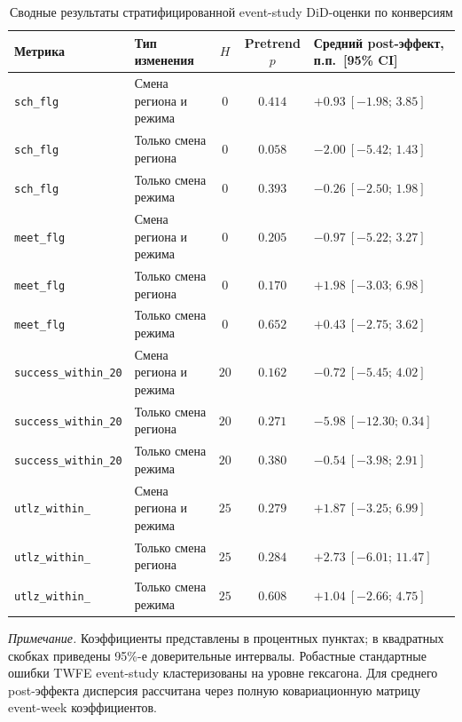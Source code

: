 \documentclass[14pt,a4paper]{extarticle}
\begin{document}
\begin{table}[H]
\centering
\caption{Сводные результаты стратифицированной event-study DiD-оценки по конверсиям}
\label{tab:stratified_did_effects}
\footnotesize
\setlength{\tabcolsep}{3pt}
\renewcommand{\arraystretch}{1.2}
\begin{tabularx}{\textwidth}{@{}l l c c >{\centering\arraybackslash}X@{}}
\toprule
Метрика & Тип изменения & \(H\) & Pretrend \(p\) & Средний post-эффект, п.п.\ [95\% CI] \\
\midrule
\texttt{sch\_flg} & Смена региона и режима & \(0\) & \(0.414\) & \(+0.93\ [-1.98;\,3.85]\) \\
\texttt{sch\_flg} & Только смена региона & \(0\) & \(0.058\) & \(-2.00\ [-5.42;\,1.43]\) \\
\texttt{sch\_flg} & Только смена режима & \(0\) & \(0.393\) & \(-0.26\ [-2.50;\,1.98]\) \\
\midrule
\texttt{meet\_flg} & Смена региона и режима & \(0\) & \(0.205\) & \(-0.97\ [-5.22;\,3.27]\) \\
\texttt{meet\_flg} & Только смена региона & \(0\) & \(0.170\) & \(+1.98\ [-3.03;\,6.98]\) \\
\texttt{meet\_flg} & Только смена режима & \(0\) & \(0.652\) & \(+0.43\ [-2.75;\,3.62]\) \\
\midrule
\texttt{success\_within\_20} & Смена региона и режима & \(20\) & \(0.162\) & \(-0.72\ [-5.45;\,4.02]\) \\
\texttt{success\_within\_20} & Только смена региона & \(20\) & \(0.271\) & \(-5.98\ [-12.30;\,0.34]\) \\
\texttt{success\_within\_20} & Только смена режима & \(20\) & \(0.380\) & \(-0.54\ [-3.98;\,2.91]\) \\
\midrule
\texttt{utlz\_\allowbreak within\_\allowbreak 25} & Смена региона и режима & \(25\) & \(0.279\) & \(+1.87\ [-3.25;\,6.99]\) \\
\texttt{utlz\_\allowbreak within\_\allowbreak 25} & Только смена региона & \(25\) & \(0.284\) & \(+2.73\ [-6.01;\,11.47]\) \\
\texttt{utlz\_\allowbreak within\_\allowbreak 25} & Только смена режима & \(25\) & \(0.608\) & \(+1.04\ [-2.66;\,4.75]\) \\
\bottomrule
\end{tabularx}
\begin{minipage}{0.98\textwidth}
\scriptsize
\textit{Примечание.} Коэффициенты представлены в процентных пунктах; в
квадратных скобках приведены 95\%-е доверительные интервалы. Робастные
стандартные ошибки TWFE event-study кластеризованы на уровне гексагона. Для
среднего post-эффекта дисперсия рассчитана через полную ковариационную матрицу
event-week коэффициентов.
\end{minipage}
\end{table}
\end{document}
